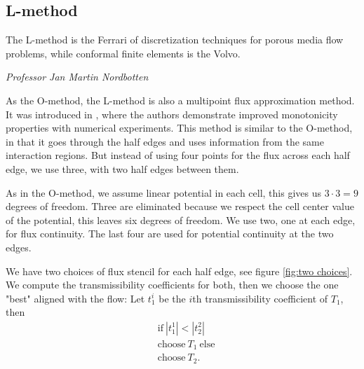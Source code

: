 \documentclass[../Main/main.tex]{subfiles}
\begin{document}
	\subsection*{L-method}
	\epigraph{The L-method is the Ferrari of discretization techniques for porous media flow problems, while conformal finite elements is the Volvo.}{\textit{Professor Jan Martin Nordbotten}}
	As the O-method, the L-method is also a multipoint flux approximation method. It was introduced in \cite{https://doi.org/10.1002/num.20320}, where the authors demonstrate improved monotonicity properties with numerical experiments. This method is similar to the O-method, in that it goes through the half edges and uses information from the same interaction regions. But instead of using four points for the flux across each half edge, we use three, with two half edges between them. \par
	As in the O-method, we assume linear potential in each cell, this gives us $3\cdot 3 = 9$ degrees of freedom. Three are eliminated because we respect the cell center value of the potential, this leaves six degrees of freedom. We use two, one at each edge, for flux continuity. The last four are used for potential continuity at the two edges. 
	\par
	We have two choices of flux stencil for each half edge, see figure \ref{fig:two choices}. We compute the transmissibility coefficients for both, then we choose the one "best" aligned with the flow: Let $t_1^i$ be the $i$th transmissibility coefficient of $T_1$, then
	\begin{equation}\label{eq:L-criterion}
		\begin{aligned}
			&\text{if} \ |t^1_1| < |t^2_2| \\
			&\text{choose} \ T_1 \ \text{else} \\
			&\text{choose} \ T_2.
		\end{aligned}
	\end{equation}
\end{document}
